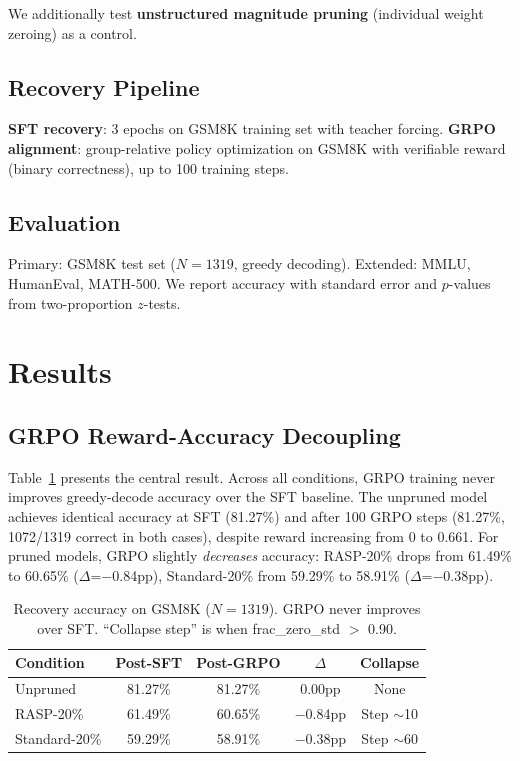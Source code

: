 \documentclass[11pt,a4paper]{article}
\begin{document}
We additionally test \textbf{unstructured magnitude pruning} (individual weight zeroing) as a control.

\subsection{Recovery Pipeline}
\textbf{SFT recovery}: 3 epochs on GSM8K training set with teacher forcing. \textbf{GRPO alignment}: group-relative policy optimization on GSM8K with verifiable reward (binary correctness), up to 100 training steps.

\subsection{Evaluation}
Primary: GSM8K test set ($N=1319$, greedy decoding). Extended: MMLU, HumanEval, MATH-500. We report accuracy with standard error and $p$-values from two-proportion $z$-tests.

\section{Results}
\label{sec:results}

\subsection{GRPO Reward-Accuracy Decoupling}
\label{sec:decoupling}

Table~\ref{tab:recovery} presents the central result. Across all conditions, GRPO training never improves greedy-decode accuracy over the SFT baseline. The unpruned model achieves identical accuracy at SFT (81.27\%) and after 100 GRPO steps (81.27\%, 1072/1319 correct in both cases), despite reward increasing from 0 to 0.661. For pruned models, GRPO slightly \emph{decreases} accuracy: RASP-20\% drops from 61.49\% to 60.65\% ($\Delta$=$-$0.84pp), Standard-20\% from 59.29\% to 58.91\% ($\Delta$=$-$0.38pp).

\begin{table}[t]
\centering
\small
\caption{Recovery accuracy on GSM8K ($N=1319$). GRPO never improves over SFT. ``Collapse step'' is when frac\_zero\_std $>$ 0.90.}
\label{tab:recovery}
\begin{tabular}{lcccc}
\toprule
\textbf{Condition} & \textbf{Post-SFT} & \textbf{Post-GRPO} & $\Delta$ & \textbf{Collapse} \\
\midrule
Unpruned & 81.27\% & 81.27\% & 0.00pp & None \\
RASP-20\% & 61.49\% & 60.65\% & $-$0.84pp & Step $\sim$10 \\
Standard-20\% & 59.29\% & 58.91\% & $-$0.38pp & Step $\sim$60 \\
\bottomrule
\end{tabular}
\end{table}
\end{document}
